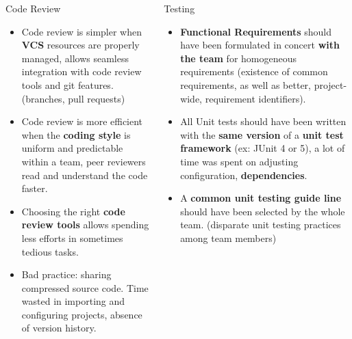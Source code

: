 \documentclass[final]{beamer}
\newlength{\onecolwid}
\newlength{\twocolwid}
\begin{document}
\begin{frame}[t]
\begin{columns}[t]
\begin{column}{\twocolwid}
\begin{columns}[t,totalwidth=\twocolwid]
\begin{column}{\onecolwid}
\begin{block}{Code Review}
\begin{itemize}
\item Code review is simpler when \textbf{VCS} resources are properly managed, allows seamless integration with code review tools and git features. (branches, pull requests)
\[\]
\item Code review is more efficient when the \textbf{coding style} is uniform and predictable within a team, peer reviewers read and understand the code faster.
\[\]
\item Choosing the right \textbf{code review tools} allows spending less efforts in sometimes tedious tasks.
\[\]
\item Bad practice: sharing compressed source code. Time wasted in importing and configuring projects, absence of version history.
\end{itemize}
\end{block}


\end{column} %

\begin{column}{\onecolwid} %


\begin{block}{Testing}
\begin{itemize}
\item \textbf{Functional Requirements} should have been formulated in concert \textbf{with the team} for homogeneous requirements (existence of common requirements, as well as better, project-wide, requirement identifiers).
\[\]
\item All Unit tests should have been written with the \textbf{same version} of a \textbf{unit test framework} (ex: JUnit 4 or 5), a lot of time was spent on adjusting configuration, \textbf{dependencies}.
\[\]
\item A \textbf{common unit testing guide line} should have been selected by the whole team. (disparate unit testing practices among team members)

\end{itemize}


\end{block}
\end{column}
\end{columns}
\end{column}
\end{columns}
\end{frame}
\end{document}
